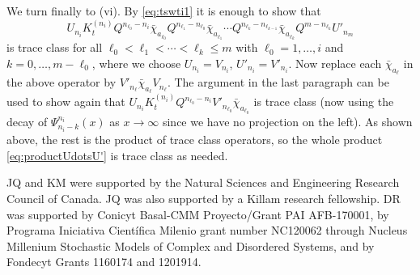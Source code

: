 \documentclass[letterpaper,reqno,11pt,oneside,final]{amsart}
\theoremstyle{definition}
\newcommand{\vs}{\vspace{6pt}}
\numberwithin{equation}{section}
\begin{document}
We turn finally to (vi).
By \eqref{eq:tswti1} it is enough to show that
\begin{equation}
U_{n_i}K^{(n_i)}_tQ^{n_{\ell_0}-n_i}\bar\chi_{a_{\ell_0}}Q^{n_{\ell_1}-n_{\ell_0}}\bar\chi_{a_{\ell_1}}\dotsm Q^{n_{\ell_k}-n_{\ell_{k-1}}}\bar\chi_{a_{\ell_k}}Q^{m-n_{\ell_k}}U'_{n_m}\label{eq:productUdotsU'}
\end{equation}
is trace class for all $\ell_0<\ell_1<\dotsm<\ell_k\leq m$ with $\ell_0=1,\dotsc,i$ and $k=0,\dotsc,m-\ell_0$, where we choose $U_{n_i}=V_{n_i}$, $U'_{n_i}=V'_{n_i}$.
Now replace each $\bar\chi_{a_\ell}$ in the above operator by $V'_{n_{\ell}}\bar\chi_{a_\ell}V_{n_\ell}$.
The argument in the last paragraph can be used to show again that $U_{n_i}K^{(n_i)}_tQ^{n_{\ell_0}-n_i}V'_{n_{\ell_0}}\bar\chi_{a_{\ell_0}}$ is trace class (now using the decay of $\Psi^{n_i}_{n_i-k}(x)$ as $x\to\infty$ since we have no projection on the left).
As shown above, the rest is the product of trace class operators, so the whole product \eqref{eq:productUdotsU'} is trace class as needed.

\vs

JQ and KM were supported by the Natural Sciences and Engineering Research Council of Canada.
JQ was also supported by a Killam research fellowship.
DR was supported by Conicyt Basal-CMM Proyecto/Grant PAI AFB-170001, by Programa Iniciativa Cient\'ifica Milenio grant number NC120062 through Nucleus Millenium Stochastic Models of Complex and Disordered Systems, and by Fondecyt Grants 1160174 and 1201914.

\printbibliography[heading=apa]
\end{document}
